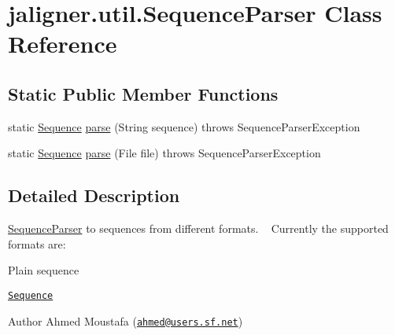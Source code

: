 \hypertarget{classjaligner_1_1util_1_1_sequence_parser}{\section{jaligner.\+util.\+Sequence\+Parser Class Reference}
\label{classjaligner_1_1util_1_1_sequence_parser}
}
\subsection*{Static Public Member Functions}
\begin{DoxyCompactItemize}
\item 
static \hyperlink{classjaligner_1_1_sequence}{Sequence} \hyperlink{classjaligner_1_1util_1_1_sequence_parser_a02a4063abb422c0ff439a53b28b725ca}{parse} (String sequence)  throws Sequence\+Parser\+Exception 
\item 
static \hyperlink{classjaligner_1_1_sequence}{Sequence} \hyperlink{classjaligner_1_1util_1_1_sequence_parser_afa8c942884d97a15c8cb646f961271d7}{parse} (File file)  throws Sequence\+Parser\+Exception 
\end{DoxyCompactItemize}


\subsection{Detailed Description}
\hyperlink{classjaligner_1_1util_1_1_sequence_parser}{Sequence\+Parser} to sequences from different formats. ~\newline
 Currently the supported formats are\+: 
\begin{DoxyItemize}
\item Plain sequence 
\item \href{http://www.ncbi.nlm.nih.gov/BLAST/fasta.html}{\tt Sequence} 
\end{DoxyItemize}

\begin{DoxyAuthor}{Author}
Ahmed Moustafa (\href{mailto:ahmed@users.sf.net}{\tt ahmed@users.\+sf.\+net}) 
\end{DoxyAuthor}


